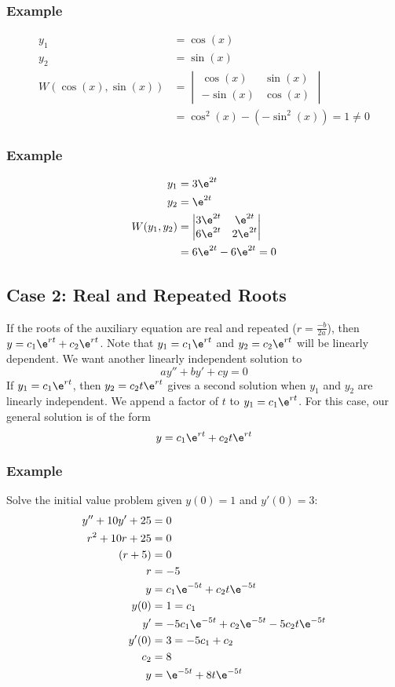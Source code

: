 \documentclass{math}
\begin{document}
\subsubsection*{Example}
\begin{align*}
  y_1 &= \cos(x) \\
  y_2 &= \sin(x) \\
  W(\cos(x),\sin(x)) &= \begin{vmatrix}
    \cos(x) & \sin(x) \\
    -\sin(x) & \cos(x)
  \end{vmatrix} \\
  &= \cos^2(x)-(-\sin^2(x)) = 1 \ne 0
\end{align*}

\subsubsection*{Example}
\begin{align*}
  y_1 &= 3\e^{2t} \\
  y_2 &= \e^{2t} \\
  W(y_1,y_2) &= \begin{vmatrix}
    3\e^{2t} & \e^{2t} \\
    6\e^{2t} & 2\e^{2t}
  \end{vmatrix} \\
  &= 6\e^{2t}-6\e^{2t} = 0
\end{align*}

\subsection*{Case 2: Real and Repeated Roots}
If the roots of the auxiliary equation are real and repeated (\( r =
\frac{-b}{2a} \)), then \( y = c_1\e^{rt}+c_2\e^{rt} \). Note that
\( y_1 = c_1\e^{rt} \) and \( y_2 = c_2\e^{rt} \) will be linearly dependent.
We want another linearly independent solution to
\[ ay''+by'+cy = 0 \]
If \( y_1 = c_1\e^{rt} \), then \( y_2 = c_2t\e^{rt} \) gives a second solution
when \( y_1 \) and \( y_2 \) are linearly independent. We append a factor of
\( t \) to \( y_1 = c_1\e^{rt} \). For this case, our general solution is of
the form
\[ y = c_1\e^{rt}+c_2t\e^{rt} \]

\subsubsection*{Example}
Solve the initial value problem given \( y(0) = 1 \) and \( y'(0) = 3 \):
\begin{align*}
  y''+10y'+25 &= 0 \\
  r^2+10r+25 &= 0 \\
  (r+5) &= 0 \\
  r &= -5 \\
  y &= c_1\e^{-5t}+c_2t\e^{-5t} \\
  y(0) &= 1 = c_1 \\
  y' &= -5c_1\e^{-5t}+c_2\e^{-5t}-5c_2t\e^{-5t} \\
  y'(0) &= 3 = -5c_1+c_2 \\
  c_2 &= 8 \\
  y &= \e^{-5t}+8t\e^{-5t}
\end{align*}
\end{document}
